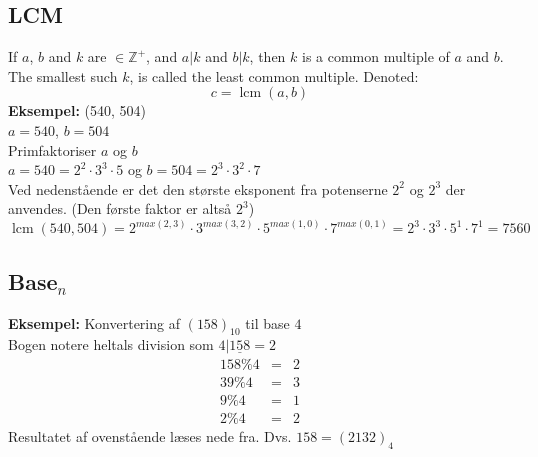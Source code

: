 \documentclass[a4paper]{article}
\newcommand{\Integers}{\mathbb{Z}}
\begin{document}
  \subsection{LCM}
   If $a$, $b$ and $k$ are $\in \Integers^+$, and $a | k$ and $b | k$, then $k$ is a common multiple of $a$ and $b$. The smallest such $k$, is called the least common multiple. Denoted:
    $$c = \operatorname{lcm}(a, b)$$
    \textbf{Eksempel:} (540, 504)\\
    $a = 540$, $b = 504$\\
    Primfaktoriser $a$ og $b$\\
    $a = 540 = 2^2 \cdot 3^3 \cdot 5$ og $b = 504 = 2^3 \cdot 3^2 \cdot 7$\\
    Ved nedenstående er det den største eksponent fra potenserne $2^2$ og $2^3$ der anvendes. (Den første faktor er altså $2^3$)\\
    $\operatorname{lcm}(540, 504) = 2^{max(2, 3)} \cdot 3^{max(3, 2)} \cdot 5^{max(1, 0)} \cdot 7^{max(0, 1)} = 2^3 \cdot 3^3 \cdot 5^1 \cdot 7^1 = 7560$


  \subsection{Base$_n$}
   
   \textbf{Eksempel:} Konvertering af $(158)_{10}$ til base $4$\\
   Bogen notere heltals division som $4|\underline{158} = 2$\\
   \begin{eqnarray}
    158 \% 4 &=& 2 \nonumber\\
    39 \% 4 &=& 3 \nonumber\\
    9 \% 4 &=& 1 \nonumber\\
    2 \% 4 &=& 2 \nonumber
   \end{eqnarray}
   Resultatet af ovenstående læses nede fra. Dvs. $158 = (2132)_4$
\end{document}

